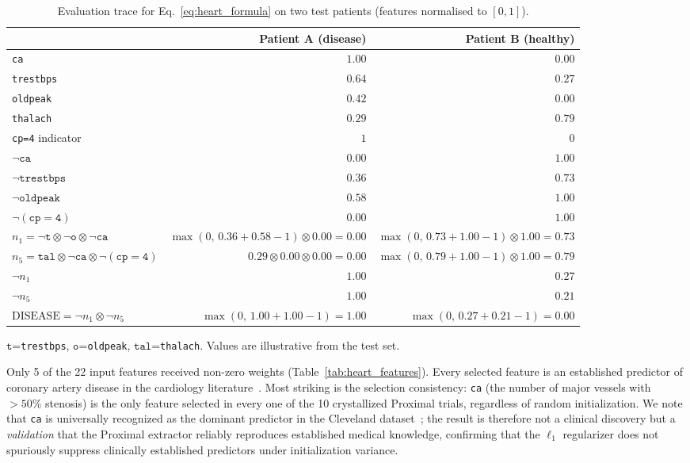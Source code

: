 \documentclass[12pt,a4paper]{article}
\newcommand{\tnorm}{\otimes}      %
\begin{document}
\begin{table}[h]
\centering
\caption{Evaluation trace for Eq.~\eqref{eq:heart_formula} on two test
patients (features normalised to $[0,1]$).}
\label{tab:heart_trace}
\setlength{\tabcolsep}{5pt}
\begin{tabular}{lrr}
\toprule
 & Patient A (disease) & Patient B (healthy) \\
\midrule
\texttt{ca} & $1.00$ & $0.00$ \\
\texttt{trestbps} & $0.64$ & $0.27$ \\
\texttt{oldpeak} & $0.42$ & $0.00$ \\
\texttt{thalach} & $0.29$ & $0.79$ \\
\texttt{cp=4} indicator & $1$ & $0$ \\
\midrule
$\neg\mathtt{ca}$ & $0.00$ & $1.00$ \\
$\neg\mathtt{trestbps}$ & $0.36$ & $0.73$ \\
$\neg\mathtt{oldpeak}$ & $0.58$ & $1.00$ \\
$\neg(\mathtt{cp{=}4})$ & $0.00$ & $1.00$ \\
\midrule
$n_1 = \neg\mathtt{t} \tnorm \neg\mathtt{o} \tnorm \neg\mathtt{ca}$
  & $\max(0,\,0.36{+}0.58{-}1) \tnorm 0.00 = 0.00$
  & $\max(0,\,0.73{+}1.00{-}1) \tnorm 1.00 = 0.73$ \\
$n_5 = \mathtt{tal} \tnorm \neg\mathtt{ca} \tnorm \neg(\mathtt{cp{=}4})$
  & $0.29 \tnorm 0.00 \tnorm 0.00 = 0.00$
  & $\max(0,\,0.79{+}1.00{-}1) \tnorm 1.00 = 0.79$ \\
\midrule
$\neg n_1$ & $1.00$ & $0.27$ \\
$\neg n_5$ & $1.00$ & $0.21$ \\
$\mathrm{DISEASE} = \neg n_1 \tnorm \neg n_5$
  & $\max(0,\,1.00{+}1.00{-}1) = \mathbf{1.00}$
  & $\max(0,\,0.27{+}0.21{-}1) = \mathbf{0.00}$ \\
\bottomrule
\end{tabular}
\end{table}
{\footnotesize $\mathtt{t}$=\texttt{trestbps}, $\mathtt{o}$=\texttt{oldpeak},
$\mathtt{tal}$=\texttt{thalach}. Values are illustrative from the test set.}

Only 5 of the 22 input features received non-zero weights
(Table~\ref{tab:heart_features}).
Every selected feature is an established predictor of coronary artery disease
in the cardiology literature~\cite{detrano1989,rudin2019}.
Most striking is the selection consistency: \texttt{ca} (the number of major
vessels with $>50\%$ stenosis) is the only feature selected in every one of
the 10 crystallized Proximal trials, regardless of random initialization.
We note that \texttt{ca} is universally recognized as the dominant predictor
in the Cleveland dataset~\cite{detrano1989}; the result is therefore not a
clinical discovery but a \emph{validation} that the Proximal extractor
reliably reproduces established medical knowledge, confirming that the
$\ell_1$ regularizer does not spuriously suppress clinically established
predictors under initialization variance.
\end{document}
